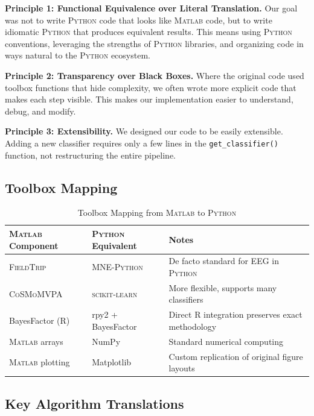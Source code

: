 \documentclass[11pt,a4paper]{article}
\newcommand{\thead}[1]{\textbf{\color{white}\sffamily #1}}
\newcommand{\theadrow}{\rowcolor{tabheader}}
\newcommand{\taltrow}{\rowcolor{softgray}}
\newenvironment{styledtable}{%
  \small\sffamily
  \renewcommand{\arraystretch}{1.35}%
}{}
\newcommand{\matlab}{\textsc{Matlab}}
\newcommand{\python}{\textsc{Python}}
\newcommand{\fieldtrip}{\textsc{FieldTrip}}
\newcommand{\cosmomvpa}{\textsc{CoSMoMVPA}}
\newcommand{\mnepython}{\textsc{MNE-Python}}
\newcommand{\sklearn}{\textsc{scikit-learn}}
\begin{document}
\textbf{Principle 1: Functional Equivalence over Literal Translation.}
Our goal was not to write \python{} code that looks like \matlab{} code, but to write idiomatic \python{} that produces equivalent results. This means using \python{} conventions, leveraging the strengths of \python{} libraries, and organizing code in ways natural to the \python{} ecosystem.

\textbf{Principle 2: Transparency over Black Boxes.}
Where the original code used toolbox functions that hide complexity, we often wrote more explicit code that makes each step visible. This makes our implementation easier to understand, debug, and modify.

\textbf{Principle 3: Extensibility.}
We designed our code to be easily extensible. Adding a new classifier requires only a few lines in the \texttt{get\_classifier()} function, not restructuring the entire pipeline.

\subsection{Toolbox Mapping}
\label{subsec:toolbox_mapping}

\begin{table}[H]
\centering
\caption{Toolbox Mapping from \matlab{} to \python{}}
\label{tab:toolbox_mapping}
\begin{styledtable}
\begin{tabular}{@{} >{\raggedright\arraybackslash}p{3.8cm} >{\raggedright\arraybackslash}p{3.8cm} >{\raggedright\arraybackslash}p{6cm} @{}}
\theadrow
\thead{\matlab{} Component} & \thead{\python{} Equivalent} & \thead{Notes} \\
\midrule
\fieldtrip{} & \mnepython{} & De facto standard for EEG in \python{} \\
\taltrow \cosmomvpa{} & \sklearn{} & More flexible, supports many classifiers \\
BayesFactor (R) & rpy2 + BayesFactor & Direct R integration preserves exact methodology \\
\taltrow \matlab{} arrays & NumPy & Standard numerical computing \\
\matlab{} plotting & Matplotlib & Custom replication of original figure layouts \\
\bottomrule
\end{tabular}
\end{styledtable}
\end{table}

\subsection{Key Algorithm Translations}
\label{subsec:algorithms}
\end{document}
